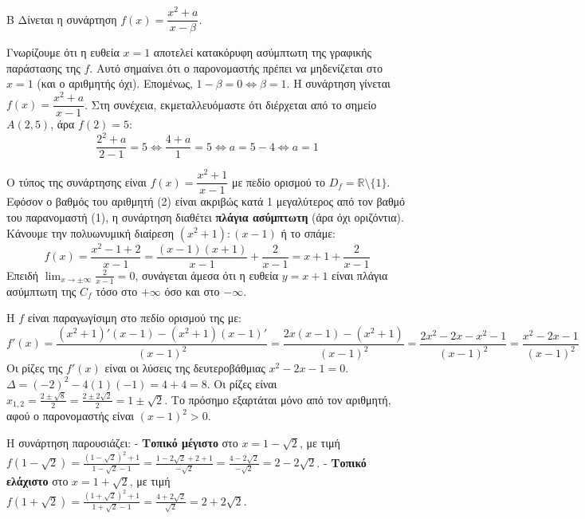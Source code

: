 
\begin{thema}{Β}
Δίνεται η συνάρτηση $f(x) = \dfrac{x^2+a}{x-\beta}$.
\begin{erwthma}
\item Γνωρίζουμε ότι η ευθεία $x=1$ αποτελεί κατακόρυφη ασύμπτωτη της γραφικής παράστασης της $f$. Αυτό σημαίνει ότι ο παρονομαστής πρέπει να μηδενίζεται στο $x=1$ (και ο αριθμητής όχι). Eπομένως, $1 - \beta = 0 \Leftrightarrow \beta = 1$.
Η συνάρτηση γίνεται $f(x) = \dfrac{x^2+a}{x-1}$.
Στη συνέχεια, εκμεταλλευόμαστε ότι διέρχεται από το σημείο $A(2, 5)$, άρα $f(2) = 5$:
\[ \frac{2^2+a}{2-1} = 5 \Leftrightarrow \frac{4+a}{1} = 5 \Leftrightarrow a = 5 - 4 \Leftrightarrow a = 1 \]

\item Ο τύπος της συνάρτησης είναι $f(x) = \dfrac{x^2+1}{x-1}$ με πεδίο ορισμού το $D_f = \mathbb{R} \setminus \{1\}$.
Εφόσον ο βαθμός του αριθμητή (2) είναι ακριβώς κατά 1 μεγαλύτερος από τον βαθμό του παρανομαστή (1), η συνάρτηση διαθέτει \textbf{πλάγια ασύμπτωτη} (άρα όχι οριζόντια).
Κάνουμε την πολυωνυμική διαίρεση $(x^2+1) : (x-1)$ ή το σπάμε:
\[ f(x) = \frac{x^2-1+2}{x-1} = \frac{(x-1)(x+1)}{x-1} + \frac{2}{x-1} = x + 1 + \frac{2}{x-1} \]
Επειδή $\lim_{x\to\pm\infty} \frac{2}{x-1} = 0$, συνάγεται άμεσα ότι η ευθεία $y = x + 1$ είναι πλάγια ασύμπτωτη της $C_f$ τόσο στο $+\infty$ όσο και στο $-\infty$.

\item Η $f$ είναι παραγωγίσιμη στο πεδίο ορισμού της με:
\[ f'(x) = \frac{(x^2+1)'(x-1) - (x^2+1)(x-1)'}{(x-1)^2} = \frac{2x(x-1) - (x^2+1)}{(x-1)^2} = \frac{2x^2 - 2x - x^2 - 1}{(x-1)^2} = \frac{x^2-2x-1}{(x-1)^2} \]
Οι ρίζες της $f'(x)$ είναι οι λύσεις της δευτεροβάθμιας $x^2-2x-1=0$.
$\Delta = (-2)^2 - 4(1)(-1) = 4 + 4 = 8$.
Οι ρίζες είναι $x_{1,2} = \frac{2 \pm \sqrt{8}}{2} = \frac{2 \pm 2\sqrt{2}}{2} = 1 \pm \sqrt{2}$.
Το πρόσημο εξαρτάται μόνο από τον αριθμητή, αφού ο παρονομαστής είναι $(x-1)^2 > 0$.
\begin{center}
\end{center}
Η συνάρτηση παρουσιάζει:
- \textbf{Τοπικό μέγιστο} στο $x = 1-\sqrt{2}$, με τιμή $f(1-\sqrt{2}) = \frac{(1-\sqrt{2})^2+1}{1-\sqrt{2}-1} = \frac{1-2\sqrt{2}+2+1}{-\sqrt{2}} = \frac{4-2\sqrt{2}}{-\sqrt{2}} = 2 - 2\sqrt{2}$.
- \textbf{Τοπικό ελάχιστο} στο $x = 1+\sqrt{2}$, με τιμή $f(1+\sqrt{2}) = \frac{(1+\sqrt{2})^2+1}{1+\sqrt{2}-1} = \frac{4+2\sqrt{2}}{\sqrt{2}} = 2 + 2\sqrt{2}$.


\end{erwthma}
\end{thema}
